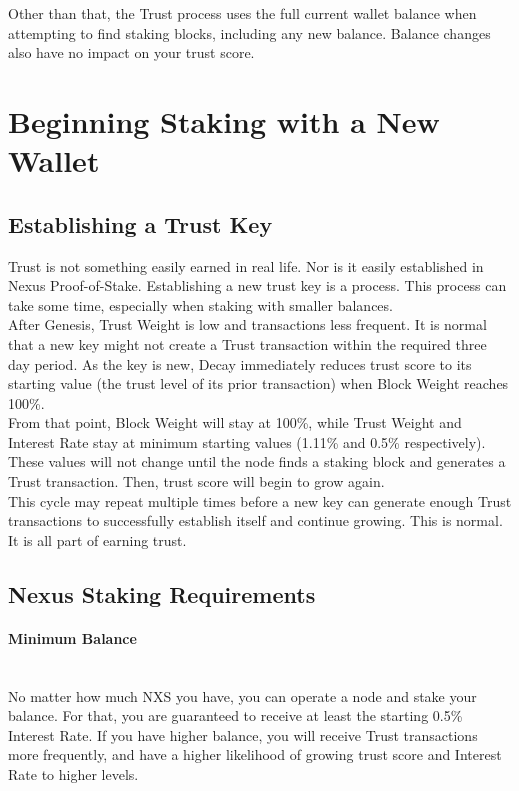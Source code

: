 \documentclass[11pt]{article}
\begin{document}
\noindent Other than that, the Trust process uses the full current wallet balance when attempting to find staking blocks, including any new balance. Balance changes also have no impact on your trust score.\\

\bigskip

\section{Beginning Staking with a New Wallet}

\subsection{Establishing a Trust Key}
Trust is not something easily earned in real life. Nor is it easily established in Nexus Proof-of-Stake. Establishing a new trust key is a process. This process can take some time, especially when staking with smaller balances.\\

\noindent After Genesis, Trust Weight is low and transactions less frequent. It is normal that a new key might not create a Trust transaction within the required three day period. As the key is new, Decay immediately reduces trust score to its starting value (the trust level of its prior transaction) when Block Weight reaches 100\%.\\ 

\noindent From that point, Block Weight will stay at 100\%, while Trust Weight and Interest Rate stay at minimum starting values (1.11\% and 0.5\% respectively). These values will not change until the node finds a staking block and generates a Trust transaction. Then, trust score will begin to grow again.\\

\noindent This cycle may repeat multiple times before a new key can generate enough Trust transactions to successfully establish itself and continue growing. This is normal. It is all part of earning trust.\\

\subsection{Nexus Staking Requirements}

\paragraph{Minimum Balance} ~\\
No matter how much NXS you have, you can operate a node and stake your balance. For that, you are guaranteed to receive at least the starting 0.5\% Interest Rate. If you have higher balance, you will receive Trust transactions more frequently, and have a higher likelihood of growing trust score and Interest Rate to higher levels.
\end{document}
